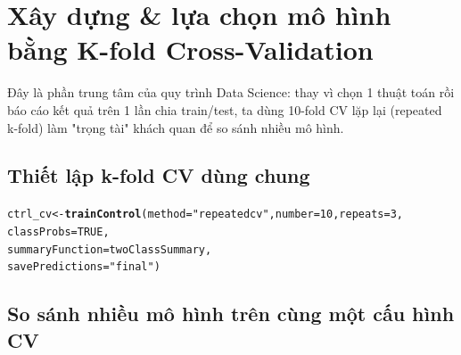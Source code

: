 \documentclass[14pt,a4paper]{extarticle}\usepackage[]{graphicx}\usepackage[]{xcolor}
\makeatletter
\newcommand{\hlnum}[1]{\textcolor[rgb]{0.686,0.059,0.569}{#1}}%
\newcommand{\hlsng}[1]{\textcolor[rgb]{0.192,0.494,0.8}{#1}}%
\newcommand{\hldef}[1]{\textcolor[rgb]{0.345,0.345,0.345}{#1}}%
\newcommand{\hlkwb}[1]{\textcolor[rgb]{0.69,0.353,0.396}{#1}}%
\newcommand{\hlkwc}[1]{\textcolor[rgb]{0.333,0.667,0.333}{#1}}%
\newcommand{\hlkwd}[1]{\textcolor[rgb]{0.737,0.353,0.396}{\textbf{#1}}}%
\newenvironment{kframe}{%
 \def\at@end@of@kframe{}%
 \ifinner\ifhmode%
  \def\at@end@of@kframe{\end{minipage}}%
  \begin{minipage}{\columnwidth}%
 \fi\fi%
 \def\FrameCommand##1{\hskip\@totalleftmargin \hskip-\fboxsep
 \colorbox{shadecolor}{##1}\hskip-\fboxsep
     \hskip-\linewidth \hskip-\@totalleftmargin \hskip\columnwidth}%
 \MakeFramed {\advance\hsize-\width
   \@totalleftmargin\z@ \linewidth\hsize
   \@setminipage}}%
 {\par\unskip\endMakeFramed%
 \at@end@of@kframe}
\newenvironment{knitrout}{}{} %
\makeatother
\begin{document}

\section{Xây dựng \& lựa chọn mô hình bằng K-fold Cross-Validation}

Đây là phần trung tâm của quy trình Data Science: thay vì chọn 1 thuật
toán rồi báo cáo kết quả trên 1 lần chia train/test, ta dùng 10-fold CV
lặp lại (repeated k-fold) làm "trọng tài" khách quan để so sánh nhiều
mô hình.

\subsection{Thiết lập k-fold CV dùng chung}

\begin{knitrout}\scriptsize
{}\color{fgcolor}\begin{kframe}
\begin{alltt}
\hldef{ctrl_cv} \hlkwb{<-} \hlkwd{trainControl}\hldef{(}\hlkwc{method} \hldef{=} \hlsng{"repeatedcv"}\hldef{,} \hlkwc{number} \hldef{=} \hlnum{10}\hldef{,} \hlkwc{repeats} \hldef{=} \hlnum{3}\hldef{,}
                         \hlkwc{classProbs} \hldef{=} \hlnum{TRUE}\hldef{,}
                         \hlkwc{summaryFunction} \hldef{= twoClassSummary,}
                         \hlkwc{savePredictions} \hldef{=} \hlsng{"final"}\hldef{)}
\end{alltt}
\end{kframe}
\end{knitrout}

\subsection{So sánh nhiều mô hình trên cùng một cấu hình CV}
\end{document}
